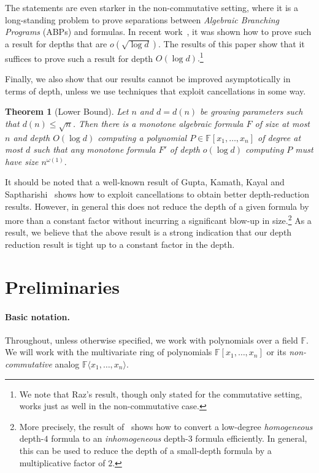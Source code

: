 \documentclass[11pt,a4paper]{article}
\newtheorem{theorem}{Theorem}
\newcommand{\F}{\mathbb{F}}
\begin{document}
The statements are even starker in the non-commutative setting, where it is a long-standing problem to prove separations between \emph{Algebraic Branching Programs} (ABPs) and formulas. In recent work~\cite{LST-STOC}, it was shown how to prove such a result for depths that are $o(\sqrt{\log d})$. The results of this paper show that it suffices to prove such a result for depth $O(\log d).$\footnote{We note that Raz's result, though only stated for the commutative setting, works just as well in the non-commutative case.}

Finally, we also show that our results cannot be improved asymptotically in terms of depth, unless we use techniques that exploit cancellations in some way.

\begin{theorem}[Lower Bound]
\label{thm:lowerbound-intro}
Let $n$ and $d = d(n)$ be growing parameters such that $d(n)\leq \sqrt{n}$. Then there is a monotone algebraic formula $F$ of size at most $n$ and depth $O(\log d)$ computing a polynomial $P\in \F[x_1,\ldots,x_n]$ of degree at most $d$ such that any monotone formula $F'$ of depth $o(\log d)$ computing $P$ must have size $n^{\omega(1)}.$
\end{theorem}


It should be noted that a well-known result of Gupta, Kamath, Kayal and Saptharishi~\cite{GKKSdepth3} shows how to exploit cancellations to obtain better depth-reduction results. However, in general this does not reduce the depth of a given formula by more than a constant factor without incurring a significant blow-up in size.\footnote{More precisely, the result of~\cite{GKKSdepth3} shows how to convert a low-degree \emph{homogeneous} depth-$4$ formula to an \emph{inhomogeneous} depth-$3$ formula efficiently. In general, this can be used to reduce the depth of a small-depth formula by a multiplicative factor of $2$.} As a result, we believe that the above result is a strong indication that our depth reduction result is tight up to a constant factor in the depth.
\section{Preliminaries}
\label{sec:prelims}

\paragraph{Basic notation.} Throughout, unless otherwise specified, we work with polynomials over a field $\F$. We will work with the multivariate ring of polynomials $\F[x_1,\ldots,x_n]$ or its \emph{non-commutative} analog $\F\langle  x_1,\ldots,x_n \rangle.$ 
\end{document}
